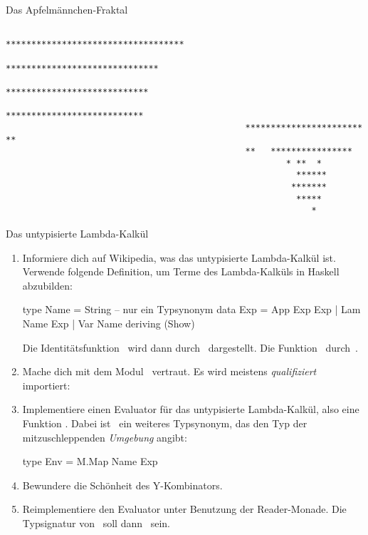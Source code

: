\documentclass{uebblatt}
\begin{document}
\begin{aufgabe}{Das Apfelmännchen-Fraktal}
\begin{tiny}
\begin{verbatim}
                                          ***********************************
                                            ******************************
                                             ****************************
                                               ***************************
                                               ***********************  **
                                               **   ****************
                                                       * **  *
                                                         ******
                                                        *******
                                                         *****
                                                            *
\end{verbatim}\end{tiny}
\end{aufgabe}

\begin{aufgabe}{Das untypisierte Lambda-Kalkül}
\begin{enumerate}
\item Informiere dich auf Wikipedia, was das untypisierte Lambda-Kalkül ist.
Verwende folgende Definition, um Terme des Lambda-Kalküls in Haskell
abzubilden:
\begin{haskellcode}
type Name = String  -- nur ein Typsynonym
data Exp
    = App Exp  Exp
    | Lam Name Exp
    | Var Name
    deriving (Show)
\end{haskellcode}
Die Identitätsfunktion~ wird dann
durch~ dargestellt. Die
Funktion~ durch~.
\item Mache dich mit dem Modul~ vertraut. Es wird
meistens \emph{qualifiziert} importiert: 
\item Implementiere einen Evaluator für das untypisierte Lambda-Kalkül, also eine
Funktion . Dabei
ist~ ein weiteres Typsynonym, das den Typ der
mitzuschleppenden \emph{Umgebung} angibt:
\begin{haskellcode}
type Env = M.Map Name Exp
\end{haskellcode}
\item Bewundere die Schönheit des Y-Kombinators.
\item Reimplementiere den Evaluator unter Benutzung der Reader-Monade. Die
Typsignatur von~ soll dann~ sein.
\end{enumerate}
\end{aufgabe}
\end{document}
